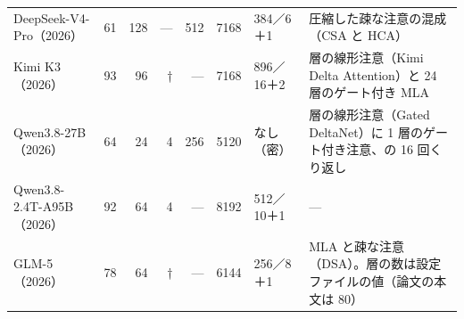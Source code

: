 \begin{table}[tbp]
\begin{tabular}{@{}lrrrrrl>{\raggedright\arraybackslash}p{44mm}@{}}
DeepSeek-V4-Pro（2026） & 61 & 128 & — & 512 & 7168 & 384／6＋1 & 圧縮した疎な注意の混成（CSA と HCA） \\
Kimi K3（2026） & 93 & 96 & † & — & 7168 & 896／16＋2 & 69 層の線形注意（Kimi Delta Attention）と 24 層のゲート付き MLA \\
Qwen3.8-27B（2026） & 64 & 24 & 4 & 256 & 5120 & なし（密） & 3 層の線形注意（Gated DeltaNet）に 1 層のゲート付き注意、の 16 回くり返し \\
Qwen3.8-2.4T-A95B（2026） & 92 & 64 & 4 & — & 8192 & 512／10＋1 & — \\
GLM-5（2026） & 78 & 64 & † & — & 6144 & 256／8＋1 & MLA と疎な注意（DSA）。層の数は設定ファイルの値（論文の本文は 80） \\
\bottomrule
\end{tabular}
\end{table}

